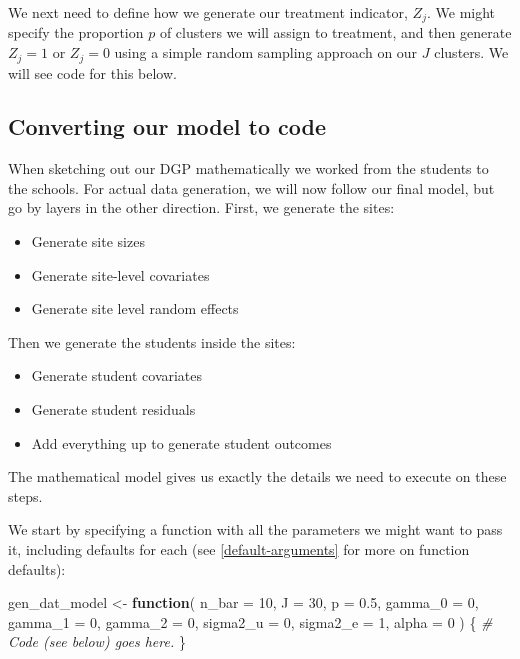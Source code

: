 \documentclass[
]{book}
\newenvironment{Shaded}{\begin{snugshade}}{\end{snugshade}}
\newcommand{\AttributeTok}[1]{\textcolor[rgb]{0.13,0.29,0.53}{#1}}
\newcommand{\CommentTok}[1]{\textcolor[rgb]{0.56,0.35,0.01}{\textit{#1}}}
\newcommand{\ControlFlowTok}[1]{\textcolor[rgb]{0.13,0.29,0.53}{\textbf{#1}}}
\newcommand{\DecValTok}[1]{\textcolor[rgb]{0.00,0.00,0.81}{#1}}
\newcommand{\FloatTok}[1]{\textcolor[rgb]{0.00,0.00,0.81}{#1}}
\newcommand{\NormalTok}[1]{#1}
\newcommand{\OtherTok}[1]{\textcolor[rgb]{0.56,0.35,0.01}{#1}}
\providecommand{\tightlist}{%
  \setlength{\itemsep}{0pt}\setlength{\parskip}{0pt}}
\begin{document}
We next need to define how we generate our treatment indicator, \(Z_j\).
We might specify the proportion \(p\) of clusters we will assign to treatment, and then generate \(Z_j = 1\) or \(Z_j = 0\) using a simple random sampling approach on our \(J\) clusters.
We will see code for this below.

\subsection{Converting our model to code}\label{converting-our-model-to-code}

When sketching out our DGP mathematically we worked from the students to the schools.
For actual data generation, we will now follow our final model, but go by layers in the other direction.
First, we generate the sites:

\begin{itemize}
\tightlist
\item
  Generate site sizes
\item
  Generate site-level covariates
\item
  Generate site level random effects
\end{itemize}

Then we generate the students inside the sites:

\begin{itemize}
\tightlist
\item
  Generate student covariates
\item
  Generate student residuals
\item
  Add everything up to generate student outcomes
\end{itemize}

The mathematical model gives us exactly the details we need to execute on these steps.

We start by specifying a function with all the parameters we might want to pass it, including defaults for each (see \ref{default-arguments} for more on function defaults):

\begin{Shaded}
\begin{Highlighting}[]
\NormalTok{gen\_dat\_model }\OtherTok{\textless{}{-}} \ControlFlowTok{function}\NormalTok{( }\AttributeTok{n\_bar =} \DecValTok{10}\NormalTok{,}
                           \AttributeTok{J =} \DecValTok{30}\NormalTok{,}
                           \AttributeTok{p =} \FloatTok{0.5}\NormalTok{,}
                           \AttributeTok{gamma\_0 =} \DecValTok{0}\NormalTok{, }\AttributeTok{gamma\_1 =} \DecValTok{0}\NormalTok{, }\AttributeTok{gamma\_2 =} \DecValTok{0}\NormalTok{,}
                           \AttributeTok{sigma2\_u =} \DecValTok{0}\NormalTok{, }\AttributeTok{sigma2\_e =} \DecValTok{1}\NormalTok{,}
                           \AttributeTok{alpha =} \DecValTok{0}\NormalTok{ ) \{}
  \CommentTok{\# Code (see below) goes here.}
\NormalTok{\}}
\end{Highlighting}
\end{Shaded}
\end{document}
